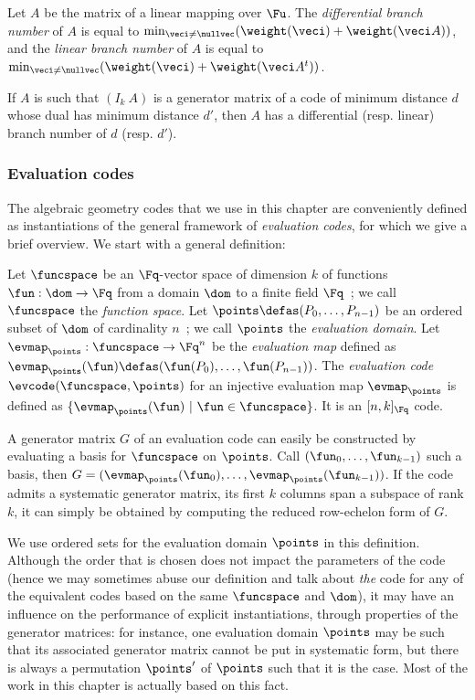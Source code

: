 \begin{defi}
Let $A$ be the matrix of a linear mapping over $\Fu$.
The \emph{differential branch number} of $A$
is equal to $\min_{\veci \neq \nullvec}(\weight(\veci) + \weight(\veci A))$,
and the \emph{linear branch number} of $A$ is equal to $\min_{\veci \neq \nullvec}(\weight(\veci) + \weight(\veci A^t))$.
\end{defi}

If $A$ is such that $(I_k~A)$ is a generator matrix of a code of minimum distance $d$ whose dual has minimum distance $d'$,
then $A$ has a differential (resp. linear) branch number of $d$ (resp. $d'$).

\subsubsection{Evaluation codes}

The algebraic geometry codes that we use in this chapter are conveniently defined as instantiations of the general framework of \emph{evaluation codes}, for which
we give a brief overview.
We start with a general definition:

\begin{defi}
Let $\funcspace$ be an $\Fq$-vector space of dimension $k$ of functions $\fun : \dom \rightarrow \Fq$ from a
domain $\dom$ to a finite field $\Fq$~; we call $\funcspace$ the \emph{function space}. Let $\points \defas (P_0,\ldots, P_{n-1})$
be an ordered subset of $\dom$ of cardinality $n$~; we call $\points$ the \emph{evaluation domain}.
Let $\evmap_\points : \funcspace \rightarrow \Fq^n$ be the \emph{evaluation map}
defined as $\evmap_\points(\fun) \defas (\fun(P_0),\ldots,\fun(P_{n-1}))$.
The \emph{evaluation code} $\evcode(\funcspace,\points)$ for an injective evaluation map $\evmap_\points$ is defined as $\{\evmap_\points(\fun)~|~\fun \in \funcspace\}$.
It is an $[n,k]_{\Fq}$ code.
\end{defi}

A generator matrix $G$ of an evaluation code can easily be constructed by evaluating a basis for $\funcspace$ on $\points$. Call $(\fun_0,\ldots,\fun_{k-1})$
such a basis, then $G = (\evmap_\points(\fun_0),\ldots,\evmap_\points(\fun_{k-1}))$.
If the code admits a systematic generator matrix, \ie its first $k$ columns span a subspace of rank $k$, it can simply be obtained by computing the reduced row-echelon form of $G$.

We use ordered sets for the evaluation domain $\points$ in this definition. Although the order that is chosen does not impact the parameters of the code (hence we
may sometimes abuse our definition and talk about \emph{the} code for any of the equivalent codes based on the same $\funcspace$ and $\dom$), it may have
an influence on the performance of explicit instantiations, through \eg properties of the generator matrices: for instance, one
evaluation domain $\points$ may be such that its associated generator matrix cannot be put in systematic form, but there is always
a permutation $\points'$ of $\points$ such that it is the case. Most of the work
in this chapter is actually based on this fact.

